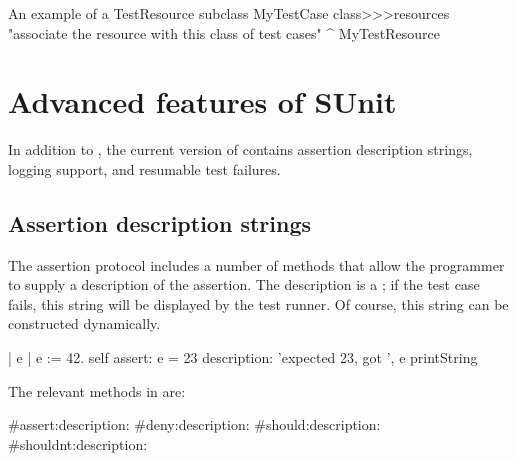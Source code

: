 \documentclass[a4paper,10pt,twoside]{book}
\begin{document}
{\begin{classdef}[mytestresource]{An example of a TestResource subclass}
MyTestCase class>>>resources
	"associate the resource with this class of test cases"
	^{ MyTestResource }
\end{classdef}






\section{Advanced features of SUnit}
In addition to , the current version of \sunit contains assertion
description strings, logging support, and resumable test failures.

\subsection{Assertion description strings}

The  assertion protocol includes a
number of methods that allow the programmer to supply a description of the assertion.  The description is a ; if the test case
fails, this string will be displayed by the test runner.  Of
course, this string can be constructed dynamically.
\begin{code}{}
| e |
e := 42.
self assert: e = 23
	description: 'expected 23, got ', e printString
\end{code}

The relevant methods in  are:
\begin{code}{}
#assert:description:
#deny:description:
#should:description:
#shouldnt:description:
\end{code}

}
\end{document}
